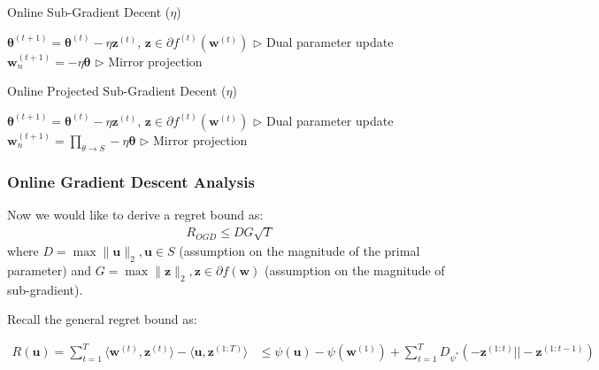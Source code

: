 \documentclass[11pt]{article}
\newcommand{\btheta}{\boldsymbol{\theta}}
\newcommand{\bz}{\boldsymbol{z}}
\newcommand{\bw}{\boldsymbol{w}}
\newcommand{\bu}{\boldsymbol{u}}
\begin{document}
\begin{algorithm}[H]
\caption{Online Sub-Gradient Decent ($\eta$)}
\label{algo:osgd}
\begin{algorithmic}[1]
\STATE $\btheta^{(t+1)} =  \btheta^{(t)} - \eta \bz ^{(t)}$, $\bz \in \partial f^{(t)}(\bw^{(t)})$ \hfill $\triangleright$ Dual parameter update
\STATE $\bw_n^{(t+1)} = -\eta \btheta$ \hfill $\triangleright$ Mirror projection
\ENDFOR
\end{algorithmic}
\end{algorithm}


\begin{algorithm}[H]
\caption{Online Projected Sub-Gradient Decent ($\eta$)}
\label{algo:opsgd}
\begin{algorithmic}[1]
\STATE $\btheta^{(t+1)} =  \btheta^{(t)} - \eta \bz ^{(t)}$, $\bz \in \partial f^{(t)}(\bw^{(t)})$ \hfill $\triangleright$ Dual parameter update
\STATE $\bw_n^{(t+1)} = \prod_{\theta \rightarrow S}-\eta \btheta$ \hfill $\triangleright$ Mirror projection
\ENDFOR
\end{algorithmic}
\end{algorithm}

\subsubsection{Online Gradient Descent Analysis}

Now we would like to derive a regret bound as:
\begin{equation*}
\begin{split}
R_{OGD} \leq DG\sqrt{T}
\end{split}
\end{equation*}
where $D=\max\|\bu\|_2, \bu \in S$ (assumption on the magnitude of the primal parameter) and $G=\max \| \bz \|_2, \bz \in \partial f(\bw)$ (assumption on the magnitude of sub-gradient).


Recall the general regret bound as:

\begin{equation*}
\begin{split}
R(\bu)=\sum_{t=1}^{T} \langle \bw^{(t)}, \bz^{(t)} \rangle
-\langle \bu,\bz^{(1:T)} \rangle
&\leq \psi(\bu)
-\psi(\boldsymbol{w}^{(1)}) 
+\sum_{t=1}^{T} D_{\psi^*} (-\bz^{(1:t)} || -\bz^{(1:t-1)})
\end{split}
\end{equation*}
\end{document}
